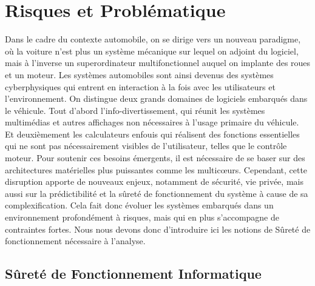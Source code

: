\documentclass[french, a4paper, 11pt, twoside, pdftex]{StyleThese}
\begin{document}
\section{Risques et Problématique}
	Dans le cadre du contexte automobile, on se dirige  vers un nouveau paradigme, où la voiture n'est plus un système mécanique sur lequel on adjoint du logiciel, mais à l'inverse un superordinateur multifonctionnel auquel on implante des roues et un moteur. 
	Les systèmes automobiles sont ainsi devenus des systèmes cyberphysiques qui entrent en interaction à la fois avec les utilisateurs et l'environnement. On distingue deux grands domaines de logiciels embarqués dans le véhicule. Tout d'abord l'info-divertissement, qui réunit les systèmes multimédias et autres affichages non nécessaires à l'usage primaire du véhicule. Et deuxièmement les calculateurs enfouis qui réalisent des fonctions essentielles qui ne sont pas nécessairement visibles de l'utilisateur, telles que le contrôle moteur. Pour soutenir ces besoins émergents, il est nécessaire de se baser sur des architectures matérielles plus puissantes comme les multicœurs. Cependant, cette disruption apporte de nouveaux enjeux, notamment de sécurité, vie privée, mais aussi sur la prédictibilité et la sûreté de fonctionnement du système à cause de sa complexification. Cela fait donc évoluer les systèmes embarqués dans un environnement profondément à risques, mais qui en plus s'accompagne de contraintes fortes. Nous nous devons donc d'introduire ici les notions de Sûreté de fonctionnement nécessaire à l'analyse.

	\subsection{Sûreté de Fonctionnement Informatique}
\end{document}
